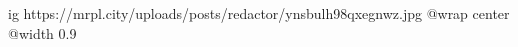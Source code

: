  
 
 
 
 

\ifcmt
  ig https://mrpl.city/uploads/posts/redactor/ynsbulh98qxegnwz.jpg
  @wrap center
  @width 0.9
\fi
